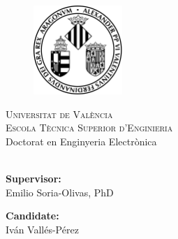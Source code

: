 \makeatletter
\begin{titlepage}
	\begin{figure}[t]
		\centering\includegraphics[width=0.3\textwidth]{titlepage/images/logo}
	\end{figure}
	\begin{center}
		\textsc{ \LARGE{Universitat de València \\}}
		\textsc{ \LARGE{Escola Tècnica Superior d'Enginieria\\ }}
		\textnormal{ \LARGE{Doctorat en Enginyeria Electrònica\\}}
		\vspace{30mm}
		\fontsize{10mm}{7mm}\selectfont 
		\textup{\@title}\\
	\end{center}
	
	\vspace{25mm}
	
	\begin{minipage}[t]{0.47\textwidth}
		\textnormal{\large{\bf Supervisor:\\}}
		{\large Emilio Soria-Olivas, PhD}
	\end{minipage}\hfill\begin{minipage}[t]{0.47\textwidth}\raggedleft
		\textnormal{\large{\bf Candidate:\\}}
		{\large Iván Vallés-Pérez}
	\end{minipage}
	
	\vspace{20mm}
	
	
\end{titlepage}
\makeatother
